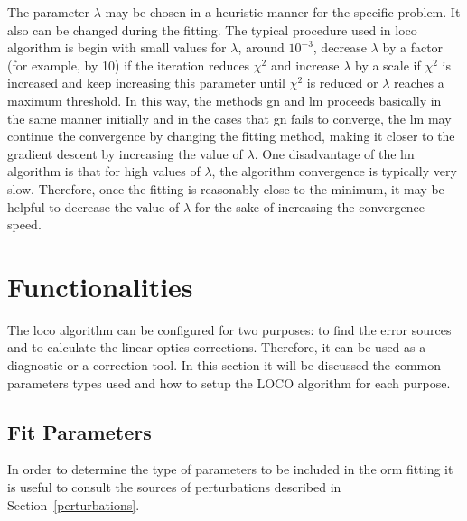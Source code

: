 The parameter $\lambda$ may be chosen in a heuristic manner for the specific problem. It also can be changed during the fitting. The typical procedure used in \gls{loco} algorithm \cite{icfa_huang, huang2019beam} is begin with small values for $\lambda$, around $10^{-3}$, decrease $\lambda$ by a factor (for example, by 10) if the iteration reduces $\chi^2$ and increase $\lambda$ by a scale if $\chi^2$ is increased and keep increasing this parameter until $\chi^2$ is reduced or $\lambda$ reaches a maximum threshold. In this way, the methods \gls{gn} and \gls{lm} proceeds basically in the same manner initially and in the cases that \gls{gn} fails to converge, the \gls{lm} may continue the convergence by changing the fitting method, making it closer to the gradient descent by increasing the value of $\lambda$. One disadvantage of the \gls{lm} algorithm is that for high values of $\lambda$, the algorithm convergence is typically very slow. Therefore, once the fitting is reasonably close to the minimum, it may be helpful to decrease the value of $\lambda$ for the sake of increasing the convergence speed.
\section{Functionalities}
The \gls{loco} algorithm can be configured for two purposes: to find the error sources and to calculate the linear optics corrections. Therefore, it can be used as a diagnostic or a correction tool. In this section it will be discussed the common parameters types used and how to setup the LOCO algorithm for each purpose.
\subsection{Fit Parameters}\label{subsec:fit_params}
In order to determine the type of parameters to be included in the \gls{orm} fitting it is useful to consult the sources of perturbations described in Section~\ref{perturbations}.

